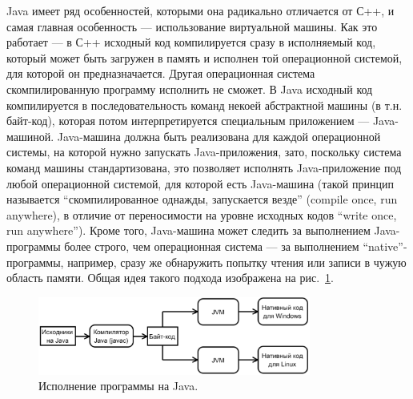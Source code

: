 \documentclass[a5paper]{article}
\begin{document}
Java имеет ряд особенностей, которыми она радикально отличается от С++, и самая главная особенность --- использование виртуальной машины. Как это работает --- в С++ исходный код компилируется сразу в исполняемый код, который может быть загружен в память и исполнен той операционной системой, для которой он предназначается. Другая операционная система скомпилированную программу исполнить не сможет. В Java исходный код компилируется в последовательность команд некоей абстрактной машины (в т.н. байт-код), которая потом интерпретируется специальным приложением --- Java-машиной. Java-машина должна быть реализована для каждой операционной системы, на которой нужно запускать Java-приложения, зато, поскольку система команд машины стандартизована, это позволяет исполнять Java-приложение под любой операционной системой, для которой есть Java-машина (такой принцип называется ``скомпилированное однажды, запускается везде'' (compile once, run anywhere), в отличие от переносимости на уровне исходных кодов ``write once, run anywhere''). Кроме того, Java-машина может следить за выполнением Java-программы более строго, чем операционная система --- за выполнением ``native''-программы, например, сразу же обнаружить попытку чтения или записи в чужую область памяти. Общая идея такого подхода изображена на рис.~\ref{figure1}.

\begin{figure}
	\begin{center}
		\includegraphics[width=0.8\textwidth]{javaCompiling.png}
	\end{center}
	\caption{Исполнение программы на Java.}
	\label{figure1}
\end{figure}
\end{document}
